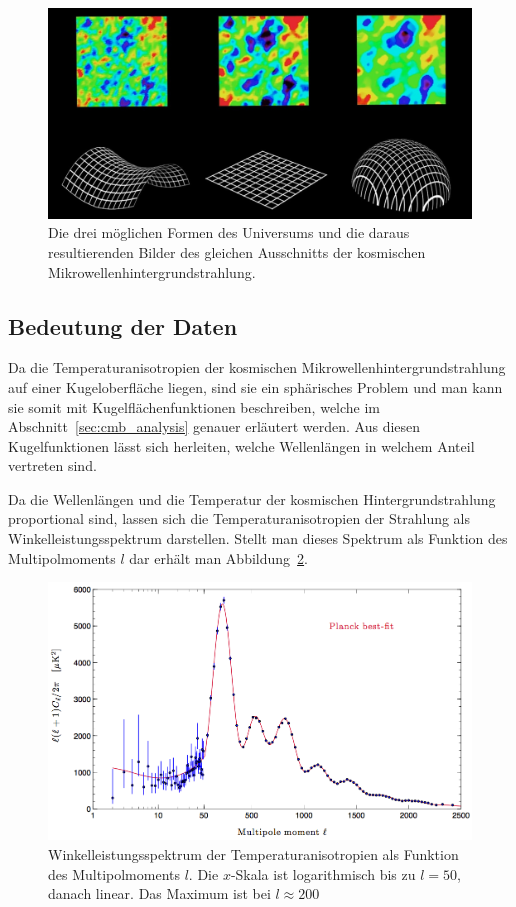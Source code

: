 \begin{figure}
	\centering
	\includegraphics[width=\linewidth]{cmb/images/universe_shapes.jpg}
	\caption{Die drei möglichen Formen des Universums und die daraus 
		resultierenden Bilder des gleichen Ausschnitts der kosmischen
		Mikrowellenhintergrundstrahlung.}
	\label{fig:universe_shapes}
\end{figure}

\subsection{Bedeutung der Daten\label{subsec:cmb:data-meaning}}
Da die Temperaturanisotropien der kosmischen Mikrowellenhintergrundstrahlung 
auf einer Kugeloberfläche liegen, sind sie ein sphärisches Problem und man kann 
sie somit mit Kugelflächenfunktionen beschreiben, welche im 
Abschnitt~\ref{sec:cmb_analysis} genauer erläutert werden. Aus diesen 
Kugelfunktionen lässt sich herleiten, welche Wellenlängen in welchem Anteil 
vertreten sind.

Da die Wellenlängen und die Temperatur der kosmischen Hintergrundstrahlung proportional sind, lassen sich die Temperaturanisotropien der Strahlung als Winkelleistungsspektrum darstellen.
Stellt man dieses Spektrum als Funktion des Multipolmoments $l$ dar erhält man 
Abbildung~\ref{fig:planck_spectrum}.

\begin{figure}
	\centering
	\includegraphics[width=\linewidth]{cmb/images/mission_spectrum.png}
	\caption{Winkelleistungsspektrum der Temperaturanisotropien als Funktion 
	des Multipolmoments $l$.
	Die $x$-Skala ist logarithmisch bis zu $l = 50$, danach linear. Das Maximum 
	ist bei $l \approx 200$}
	\label{fig:planck_spectrum}
\end{figure}

